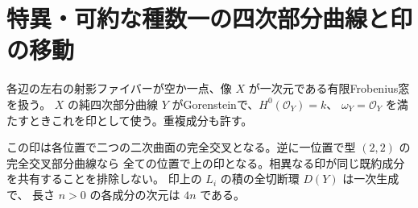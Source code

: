 \section{特異・可約な種数一の四次部分曲線と印の移動}
\label{sec:genus-one-point-marks}
各辺の左右の射影ファイバーが空か一点、像 $X$ が一次元である有限Frobenius窓を扱う。
$X$ の純四次部分曲線 $Y$ がGorensteinで、$H^0(\mathcal O_Y)=k$、
$\omega_Y=\mathcal O_Y$ を満たすときこれを印として使う。重複成分も許す。

\begin{lemma}\label{lem:genus-one-quartic-mark}
この印は各位置で二つの二次曲面の完全交叉となる。逆に一位置で型 $(2,2)$ の完全交叉部分曲線なら
全ての位置で上の印となる。相異なる印が同じ既約成分を共有することを排除しない。
印上の $L_i$ の積の全切断環 $D(Y)$ は一次生成で、
長さ $n>0$ の各成分の次元は $4n$ である。
\end{lemma}

